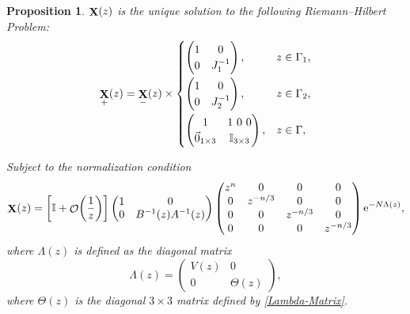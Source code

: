 \documentclass[pdftex]{sigma}
\DeclareMathOperator{\OO}{\mathcal{O}}
\DeclareMathOperator{\XX}{{\bf X}}
\numberwithin{equation}{section}
\newtheorem{Proposition}[Theorem]{Proposition}
 { \theoremstyle{definition}
\newtheorem{Definition}[Theorem]{Definition}
\newtheorem{Note}[Theorem]{Note}
\newtheorem{Example}[Theorem]{Example}
\newtheorem{Remark}[Theorem]{Remark} }
\begin{document}
 \begin{Proposition}
 $\XX(z)$ is the unique solution to the following Riemann--Hilbert Problem:
 \begin{equation*}
 \XX_{+}(z) = \XX_{-}(z) \times
 \begin{cases}
 \begin{pmatrix}
 1 & 0\\
 0 & J_1^{-1}
 \end{pmatrix}, & z \in \Gamma_1,\vspace{1mm}\\
 \begin{pmatrix}
 1 & 0\\
 0 & J_2^{-1}
 \end{pmatrix}, & z \in \Gamma_2,\vspace{1mm}\\
 \begin{pmatrix}
 1 & 1 \ 0 \ 0\\
 \vec{0}_{1\times 3} & \mathbb{I}_{3\times3}
 \end{pmatrix}, & z \in \Gamma,\\
 \end{cases}
 \end{equation*}

 Subject to the normalization condition
 \begin{align}\label{X-asymptotics}
 \XX(z) =
 \biggl[\mathbb{I} + \OO\biggl(\frac{1}{z}\biggr)\biggr]\begin{pmatrix}
 1 & 0\\
 0 & B^{-1}(z) A^{-1}(z)
 \end{pmatrix}
 \begin{pmatrix}
 z^n & 0 & 0 & 0\\
 0 & z^{-n/3} & 0 & 0\\
 0 & 0 & z^{-n/3} & 0\\
 0 & 0 & 0 & z^{-n/3}
 \end{pmatrix}{\rm e}^{-N\Lambda(z)},
 \end{align}
where $\Lambda(z)$ is defined as the diagonal matrix
 \begin{equation*}
 \Lambda(z) =
 \begin{pmatrix}
 V(z) & 0\\
 0 & \Theta(z)
 \end{pmatrix},
 \end{equation*}
where $\Theta(z)$ is the diagonal $3\times 3$ matrix defined by \eqref{Lambda-Matrix}.
 \end{Proposition}
\end{document}
